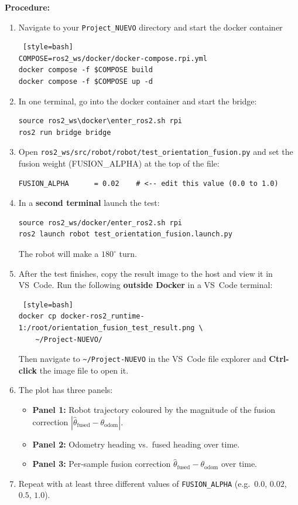 \documentclass[12pt,letterpaper]{article}
\begin{document}
\textbf{Procedure:}
\begin{enumerate}
  \item Navigate to your \texttt{Project\_NUEVO} directory and start the docker container
\begin{lstlisting} [style=bash]
COMPOSE=ros2_ws/docker/docker-compose.rpi.yml
docker compose -f $COMPOSE build
docker compose -f $COMPOSE up -d
\end{lstlisting}
  \item In one terminal, go into the docker container and
        start the bridge:
\begin{lstlisting}[style=bash]
source ros2_ws\docker\enter_ros2.sh rpi
ros2 run bridge bridge
\end{lstlisting}
  \item Open \texttt{ros2\_ws/src/robot/robot/test\_orientation\_fusion.py}
        and set the fusion weight (FUSION\_ALPHA) at the top of the file:
\begin{lstlisting}[style=python, caption={Tunable parameters in test\_orientation\_fusion.py}]
FUSION_ALPHA      = 0.02    # <-- edit this value (0.0 to 1.0)
\end{lstlisting}
  \item In a \textbf{second terminal} launch the test:
\begin{lstlisting}[style=bash]
source ros2_ws/docker/enter_ros2.sh rpi
ros2 launch robot test_orientation_fusion.launch.py
\end{lstlisting}
        The robot will make a $180^\circ$ turn.
  \item After the test finishes, copy the result image to the host and view
        it in VS~Code.  Run the following \textbf{outside Docker} in a
        VS~Code terminal:
\begin{lstlisting} [style=bash]
docker cp docker-ros2_runtime-1:/root/orientation_fusion_test_result.png \
    ~/Project-NUEVO/
\end{lstlisting}
        Then navigate to \texttt{\textasciitilde/Project-NUEVO} in the
        VS~Code file explorer and \textbf{Ctrl-click} the image file to
        open it.
  \item The plot has three panels:
        \begin{itemize}
          \item \textbf{Panel 1:} Robot trajectory coloured by the magnitude of
                the fusion correction $|\hat\theta_{\text{fused}} - \theta_{\text{odom}}|$.
          \item \textbf{Panel 2:} Odometry heading vs.\ fused heading over
                time.
          \item \textbf{Panel 3:} Per-sample fusion correction
                $\hat\theta_{\text{fused}} - \theta_{\text{odom}}$ over time.
        \end{itemize}
  \item Repeat with at least three different values of \texttt{FUSION\_ALPHA}
        (e.g.\ $0.0$, $0.02$, $0.5$, $1.0$).
\end{enumerate}
\end{document}
